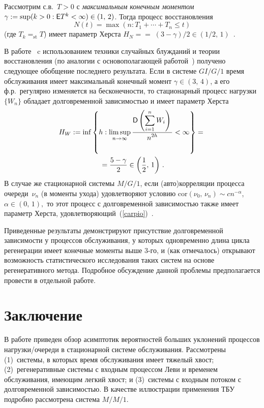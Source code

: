\begin{multicols}{2}
Рассмотрим с.в.~$T>0$ с {\it максимальным конечным моментом}
$\gamma:=\sup(k>0: {\sf E} T^k<\infty)\in (1,\,2)$. Тогда процесс
восстановления
$$N(t)=\max (n:T_1+\cdots+T_n\le t)$$
(где $T_k=_{\mathrm{st}}T$) имеет параметр Херста
$H_N =$\linebreak $=\;(3-\gamma)/2\in (1/2,\,1)$~\cite {Daley}.

В работе~\cite {Carpio} c использованием техники случайных
блужданий и теории восстановления (по аналогии с основополагающей
работой~\cite {Daley68}) получено следующее обобщение последнего
результата. Если в сис\-те\-ме $GI/G/1$ время обслуживания имеет
максимальный конечный момент $\gamma\in (3,\,4)$, а его ф.р.\
регулярно изменяется на бесконечности, то стационарный процесс
нагрузки~$\{W_n\}$ обладает долговременной зависимостью и имеет
параметр Херста
\begin{multline}
H_W :=\inf \left\{h: \limsup_{n\to \infty}
\displaystyle\frac{\displaystyle {\sf D}\left(\sum\limits_{i=1}^n W_i\right)\mathstrut}{\displaystyle n^{2h}\mathstrut}<\infty\right\}={}\\
{}= \displaystyle\frac{\displaystyle 5-\gamma\mathstrut}{\displaystyle 2\mathstrut}\in \left(\displaystyle\frac{\displaystyle 1\mathstrut}{\displaystyle 2\mathstrut},\,1\right)\,.
\label{carpio}
\end{multline}
В случае же стационарной сис\-те\-мы $M/G/1$, если (авто)корреляции
процесса очереди~$\nu_n$ (в моменты ухода) удовлетворяют условию
$\mathrm{cor}(\nu_0,\,\nu_n)\sim c n^{-\alpha}$, $\alpha\in (0,\,1),$ то
этот процесс с долговременной зависимостью также имеет параметр
Херста, удовлетворяющий~(\ref{carpio})~\cite{Carpio}.

Приведенные результаты демонстрируют присутствие долговременной зависимости у процессов
обслуживания, у которых одновременно длина цик\-ла регенерации имеет
конечные моменты выше \mbox{3-го}, и (как отмечалось) открывают возможность
статистического исследования таких систем на основе регенеративного
метода. Подробное обсуждение данной проблемы предполагается про\-вес\-ти в отдельной работе.

\section{Заключение}

В работе приведен обзор асимптотик вероятностей больших уклонений
процессов нагрузки/очереди в стационарной сис\-те\-ме обслуживания.
Рассмотрены (1)~сис\-те\-мы, в которых время обслуживания имеет тяжелый
хвост; (2)~регенеративные сис\-те\-мы с входным процессом Леви и
временем обслуживания, имеющим легкий хвост; и (3)~сис\-те\-мы с входным
потоком с долговременной за\-ви\-си\-мостью. В качестве иллюстрации
применения ТБУ подробно рассмотрена сис\-те\-ма $M/M/1$.


\end{multicols}
